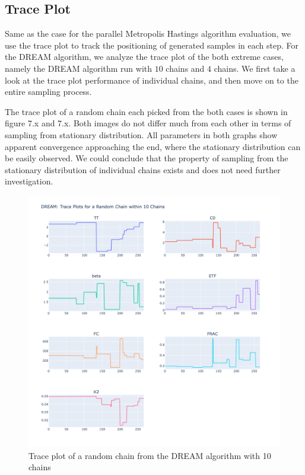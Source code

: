 \subsection{Trace Plot}
Same as the case for the parallel Metropolis Hastings algorithm evaluation, we use the trace plot to track the positioning of generated samples in each step. For the DREAM algorithm, we analyze the trace plot of the both extreme cases, namely the DREAM algorithm run with $10$ chains and $4$ chains. We first take a look at the trace plot performance of individual chains, and then move on to the entire sampling process.

The trace plot of a random chain each picked from the both cases is shown in figure 7.x and 7.x. Both images do not differ much from each other in terms of sampling from stationary distribution. All parameters in both graphs show apparent convergence approaching the end, where the stationary distribution can be easily observed. We could conclude that the property of sampling from the stationary distribution of individual chains exists and does not need further investigation.

\begin{figure}[H]
    \centering
    \includegraphics[width=1\textwidth]{figures/dream/tp_rand_10.png}
    \captionsetup{width=.8\textwidth}
    \caption{Trace plot of a random chain from the DREAM algorithm with 10 chains}
    \label{fig:enter-label}
\end{figure}

